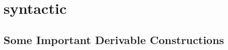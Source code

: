 \documentclass[11pt,a4paper,UKenglish,twoside,openright]{Thesis}
\begin{document}




\chapter{syntactic \wog}




\section{Some Important Derivable Constructions}


	




%










%


%


%




%


%
\end{document}
